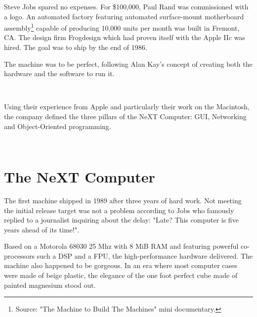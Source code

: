 Steve Jobs spared no expenses. For \$100,000, Paul Rand was commissioned with a logo. An automated factory featuring automated surface-mount motherboard assembly\footnote{Source: "The Machine to Build The Machines" mini documentary.} capable of producing 10,000 units per month was built in Fremont, CA. The design firm Frogdesign which had proven itself with the Apple IIc was hired. The goal was to ship by the end of 1986.\\
\par
The machine was to be perfect, following Alan Kay's concept of creating both the hardware and the software to run it.\\
\par
{}\\
\par

Using their experience from Apple and particularly their work on the Macintosh, the company defined the three pillars of the NeXT Computer: GUI, Networking and Object-Oriented programming.\\
\par
{}\\






\par
\section{The NeXT Computer}
The first machine shipped in 1989 after three years of hard work. Not meeting the initial release target was not a problem according to Jobs who famously replied to a journalist inquiring about the delay: "Late? This computer is five years ahead of its time!".\\
\par
Based on a Motorola 68030 25 Mhz with 8 MiB RAM and featuring powerful co-processors such a DSP and a FPU, the high-performance hardware delivered. The machine also happened to be gorgeous. In an era where most computer cases were made of beige plastic, the elegance of the one foot perfect cube made of painted magnesium stood out.\\
\par
{}


